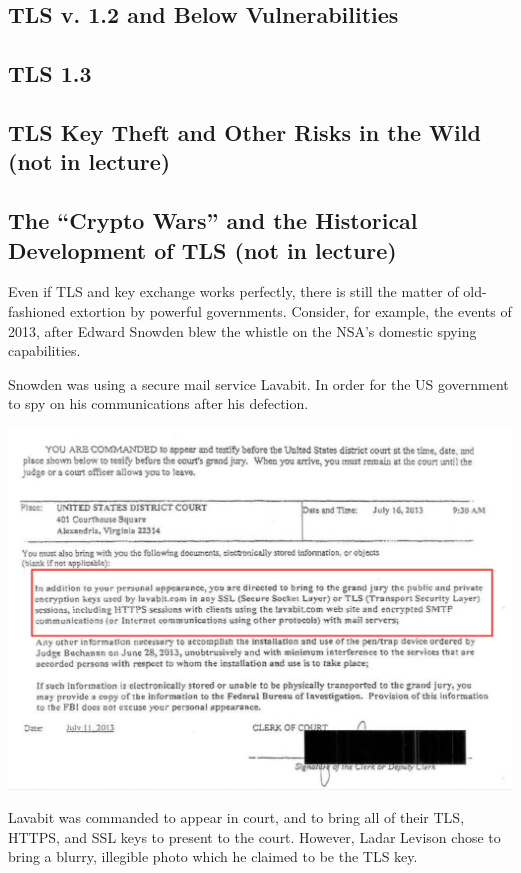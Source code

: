 \documentclass[11pt]{article} %
\begin{document}
{\subsection{TLS v. 1.2 and Below Vulnerabilities}

\subsection{TLS 1.3}

\subsection{TLS Key Theft and Other Risks in the Wild (not in lecture)}

\subsection{The “Crypto Wars” and the Historical Development of TLS (not in 
lecture)}

Even if TLS and key exchange works perfectly, there is still the matter of old-fashioned extortion by powerful governments. Consider, for example, the events of 2013, after Edward Snowden blew the whistle on the NSA's domestic spying capabilities.

Snowden was using a secure mail service Lavabit. In order for the US government to spy on his communications after his defection.

\includegraphics[scale=.3]{./lavabit-summons.png}

Lavabit was commanded to appear in court, and to bring all of their TLS, HTTPS, and SSL keys to present to the court. However, Ladar Levison chose to bring a blurry, illegible photo which he claimed to be the TLS key.

}
\end{document}
